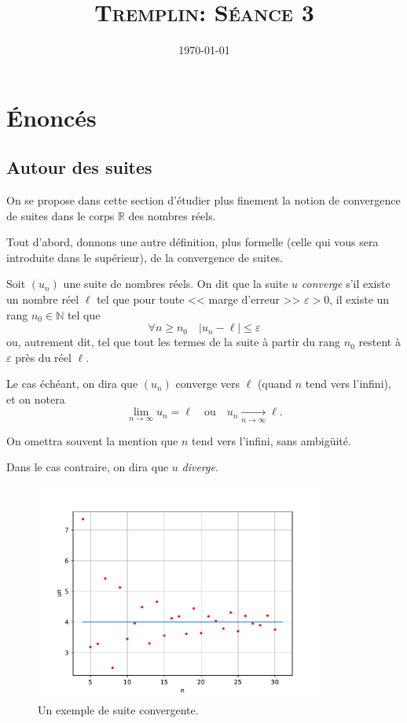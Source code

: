 \documentclass[12pt]{article}
\title{\textsc{Tremplin: Séance 3}}
\date{\today}
\author{}
\newcommand{\RR}{\mathbb R}
\newcommand{\NN}{\mathbb N}
\renewcommand{\epsilon}{\varepsilon}
\theoremstyle{definition}
\theoremstyle{theorem}
\begin{document}
\maketitle

\section*{Énoncés}

\subsection*{Autour des suites}

On se propose dans cette section d'étudier plus finement la notion de convergence de suites dans le corps $\RR$ des nombres réels.

Tout d'abord, donnons une autre définition, plus formelle (celle qui vous sera introduite dans le supérieur), de la convergence de suites.

\begin{defn}
Soit $(u_n)$ une suite de nombres réels. On dit que la suite $u$ \emph{converge} s'il existe un nombre réel $\ell$ tel que pour toute << marge d'erreur >> $\epsilon > 0$, il existe un rang $n_0\in\NN$ tel que
\[
\forall n\geq n_0\quad
|u_n - \ell| \leq \epsilon
\]
ou, autrement dit, tel que tout les termes de la suite à partir du rang $n_0$ restent à $\epsilon$ près du réel $\ell$.

Le cas échéant, on dira que $(u_n)$ converge vers $\ell$ (quand $n$ tend vers l'infini), et on notera
\[
\lim_{n\to\infty} u_n = \ell\quad \text{ou}\quad u_n\xrightarrow[n\to\infty]{}\ell.
\]

On omettra souvent la mention que $n$ tend vers l'infini, sans ambigüité.

Dans le cas contraire, on dira que $u$ \emph{diverge}.
\end{defn}

\begin{figure}
	\centering
	\includegraphics[width=0.85\textwidth]{resources/convergence.pdf}
	\caption{Un exemple de suite convergente.}
\end{figure}
\end{document}
